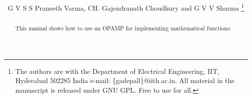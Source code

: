 \documentclass[journal,12pt,twocolumn]{IEEEtran}
\begin{document}
\title{
}
%
%
%

\author{G V S S Praneeth Varma, CH. Gajendranath Choudhury and G V V Sharma %
\thanks{The authors are with the Department
of Electrical Engineering, IIT, Hyderabad
502285 India e-mail: \{gadepall\}@iith.ac.in. All material in the manuscript is released under GNU GPL.  Free to use for all.
}}



\maketitle

\tableofcontents

\bigskip

\begin{abstract}
This manual shows how to use an OPAMP for implementing mathematical functions.

\end{abstract}
%
\end{document}
